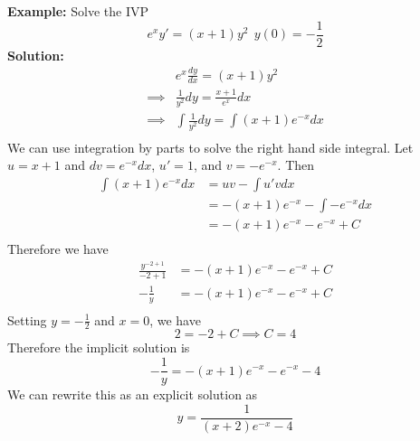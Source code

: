 \documentclass[openany]{report}
\begin{document}
\textbf{Example:} Solve the IVP
\[e^xy' = (x+1)y^2 \ \ y(0) = -\frac{1}{2}\]
\textbf{Solution:} 
\begin{align*}
    &e^x\frac{dy}{dx} = (x+1)y^2 \\
    \implies& \frac{1}{y^2}dy = \frac{x+1}{e^x}dx \\
    \implies& \int \frac{1}{y^2}dy = \int (x+1)e^{-x}dx \\
\end{align*}
We can use integration by parts to solve the right hand side integral. Let $u = x+1$ and $dv = e^{-x}dx$, $u' = 1$, and $v = -e^{-x}$. Then 
\begin{align*}
    \int (x+1)e^{-x}dx &= uv - \int u'vdx\\
    &= -(x+1)e^{-x} - \int -e^{-x}dx\\
    &= -(x+1)e^{-x} - e^{-x} + C\\
\end{align*}
Therefore we have 
\begin{align*}
    \frac{y^{-2 +1}}{-2 + 1} &= -(x+1)e^{-x} - e^{-x} + C\\
    -\frac{1}{y} &= -(x+1)e^{-x} - e^{-x} + C\\
\end{align*}
Setting $y = -\frac{1}{2}$ and $x = 0$, we have 
\[2 = -2 + C \implies C = 4\]
Therefore the implicit solution is 
\[-\frac{1}{y} = -(x+1)e^{-x} - e^{-x} - 4\]
We can rewrite this as an explicit solution as 
\[y = \frac{1}{(x+2)e^{-x}-4}\]
\end{document}
